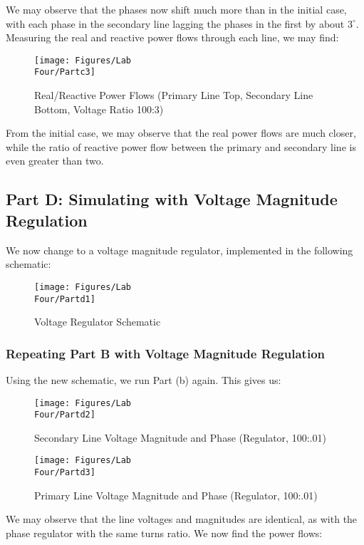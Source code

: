 \documentclass[
	letterpaper, %
	10pt, %
]{CSUniSchoolLabReport}
\begin{document}
We may observe that the phases now shift much more than in the initial case, with each phase in the secondary line lagging the phases in the first by about $3^{\circ}$. Measuring the real and reactive power flows through each line, we may find:

\begin{figure}[H]
  \centering
  \texttt{[image: Figures/Lab\\ Four/Partc3]}
  \caption{Real/Reactive Power Flows (Primary Line Top, Secondary Line Bottom, Voltage Ratio 100:3)}
  \label{fig:7}
\end{figure}

From the initial case, we may observe that the real power flows are much closer, while the ratio of reactive power flow between the primary and secondary line is even greater than two.

\subsection{Part D: Simulating with Voltage Magnitude Regulation}

We now change to a voltage magnitude regulator, implemented in the following schematic:

\begin{figure}[H]
  \centering
  \texttt{[image: Figures/Lab\\ Four/Partd1]}
  \caption{Voltage Regulator Schematic}
  \label{fig:8}
\end{figure}

\subsubsection{Repeating Part B with Voltage Magnitude Regulation}

Using the new schematic, we run Part (b) again. This gives us:

\begin{figure}[H]
  \centering
  \texttt{[image: Figures/Lab\\ Four/Partd2]}
  \caption{Secondary Line Voltage Magnitude and Phase (Regulator, 100:.01)}
  \label{fig:9}
\end{figure}

\begin{figure}[H]
  \centering
  \texttt{[image: Figures/Lab\\ Four/Partd3]}
  \caption{Primary Line Voltage Magnitude and Phase (Regulator, 100:.01)}
  \label{fig:10}
\end{figure}

We may observe that the line voltages and magnitudes are identical, as with the phase regulator with the same turns ratio. We now find the power flows:
\end{document}
